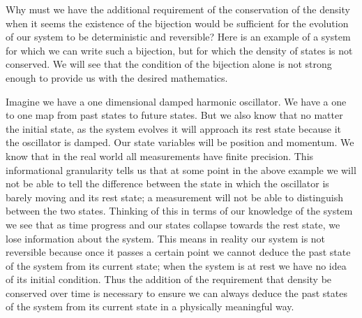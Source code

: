 \documentclass{article}[a4paper]
\begin{document}
	Why must we have the additional requirement of the conservation of the density when it seems the existence of the bijection would be sufficient for the evolution of our system to be deterministic and reversible? Here is an example of a system for which we can write such a bijection, but for which the density of states is not conserved. We will see that the condition of the bijection alone is not strong enough to provide us with the desired mathematics.
	
	Imagine we have a one dimensional damped harmonic oscillator. We have a one to one map from past states to future states. But we also know that no matter the initial state, as the system evolves it will approach its rest state because it the oscillator is damped. Our state variables will be position and momentum. We know that in the real world all measurements have finite precision. This informational granularity tells us that at some point in the above example we will not be able to tell the difference between the state in which the oscillator  is barely moving and its rest state; a measurement will not be able to distinguish between the two states. Thinking of this in terms of our knowledge of the system we see that as time progress and our states collapse towards the rest state, we lose information about the system. This means in reality our system is not reversible because once it passes a certain point we cannot deduce the past state of the system from its current state; when the system is at rest we have no idea of its initial condition. Thus the addition of the requirement that density be conserved over time is necessary to ensure we can always deduce the past states of the system from its current state in a physically meaningful way.
	
\end{document}
